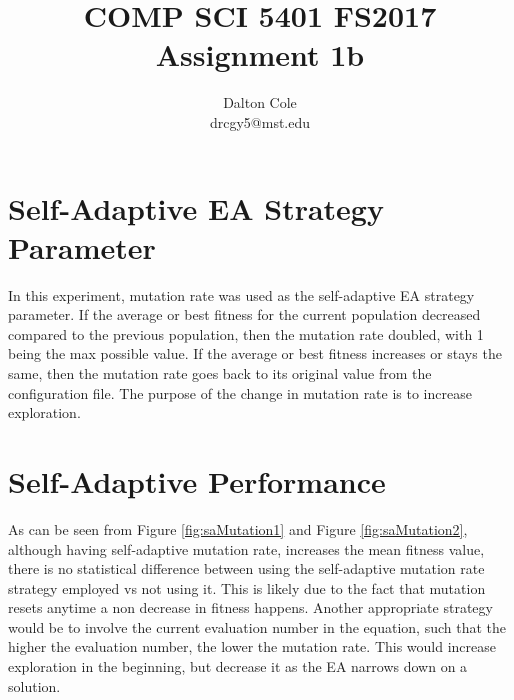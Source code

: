 \documentclass[times]{article}
\begin{document}
	\title{COMP SCI 5401 FS2017 Assignment 1b}
	\author{Dalton Cole \\ drcgy5@mst.edu}
	\date{}
	\maketitle

	\section{Self-Adaptive EA Strategy Parameter}
	In this experiment, mutation rate was used as the self-adaptive EA strategy parameter. If the average or best fitness for the current population decreased compared to the previous population, then the mutation rate doubled, with 1 being the max possible value. If the average or best fitness increases or stays the same, then the mutation rate goes back to its original value from the configuration file. The purpose of the change in mutation rate is to increase exploration. 

	\section{Self-Adaptive Performance}
	As can be seen from Figure \ref{fig:saMutation1} and Figure \ref{fig:saMutation2}, although having self-adaptive mutation rate, increases the mean fitness value, there is no statistical difference between using the self-adaptive mutation rate strategy employed vs not using it. This is likely due to the fact that mutation resets anytime a non decrease in fitness happens. Another appropriate strategy would be to involve the current evaluation number in the equation, such that the higher the evaluation number, the lower the mutation rate. This would increase exploration in the beginning, but decrease it as the EA narrows down on a solution.
\end{document}
